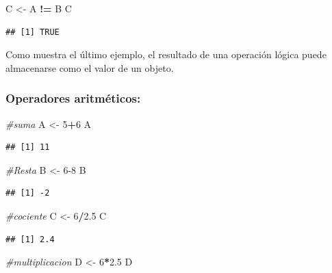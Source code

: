 \documentclass[]{book}
\newenvironment{Shaded}{\begin{snugshade}}{\end{snugshade}}
\newcommand{\CommentTok}[1]{\textcolor[rgb]{0.56,0.35,0.01}{\textit{#1}}}
\newcommand{\DecValTok}[1]{\textcolor[rgb]{0.00,0.00,0.81}{#1}}
\newcommand{\FloatTok}[1]{\textcolor[rgb]{0.00,0.00,0.81}{#1}}
\newcommand{\NormalTok}[1]{#1}
\newcommand{\OperatorTok}[1]{\textcolor[rgb]{0.81,0.36,0.00}{\textbf{#1}}}
\newcommand{\StringTok}[1]{\textcolor[rgb]{0.31,0.60,0.02}{#1}}
\begin{document}
\begin{Shaded}
\begin{Highlighting}[]
\NormalTok{C <-}\StringTok{ }\NormalTok{A }\OperatorTok{!=}\StringTok{ }\NormalTok{B}
\NormalTok{C}
\end{Highlighting}
\end{Shaded}

\begin{verbatim}
## [1] TRUE
\end{verbatim}

Como muestra el último ejemplo, el resultado de una operación lógica puede almacenarse como el valor de un objeto.

\hypertarget{operadores-aritmeticos}{%
\subsubsection{Operadores aritméticos:}\label{operadores-aritmeticos}}

\begin{Shaded}
\begin{Highlighting}[]
\CommentTok{#suma}
\NormalTok{A <-}\StringTok{ }\DecValTok{5}\OperatorTok{+}\DecValTok{6}
\NormalTok{A}
\end{Highlighting}
\end{Shaded}

\begin{verbatim}
## [1] 11
\end{verbatim}

\begin{Shaded}
\begin{Highlighting}[]
\CommentTok{#Resta}
\NormalTok{B <-}\StringTok{ }\DecValTok{6-8}
\NormalTok{B}
\end{Highlighting}
\end{Shaded}

\begin{verbatim}
## [1] -2
\end{verbatim}

\begin{Shaded}
\begin{Highlighting}[]
\CommentTok{#cociente}
\NormalTok{C <-}\StringTok{ }\DecValTok{6}\OperatorTok{/}\FloatTok{2.5}
\NormalTok{C}
\end{Highlighting}
\end{Shaded}

\begin{verbatim}
## [1] 2.4
\end{verbatim}

\begin{Shaded}
\begin{Highlighting}[]
\CommentTok{#multiplicacion}
\NormalTok{D <-}\StringTok{ }\DecValTok{6}\OperatorTok{*}\FloatTok{2.5}
\NormalTok{D}
\end{Highlighting}
\end{Shaded}
\end{document}
